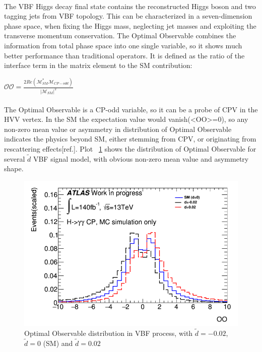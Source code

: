 \paragraph{}The VBF Higgs decay final state contains the reconstructed Higgs boson and two tagging jets from VBF topology. This can be characterized in a seven-dimension phase space, when fixing the Higgs mass, neglecting jet masses and exploiting the transverse momentum conservation. The Optimal Observable combines the information from total phase space into one single variable, so it shows much better performance than traditional operators. It is defined as the ratio of the interface term in the matrix element to the SM contribution: 

\begin{center}
\begin{math}
\mathcal{OO} = \frac{2Re(\mathcal{M}^{\ast}_{SM} \mathcal{M}_{CP-odd})}{|\mathcal{M}_{SM}|^2}
\end{math}
\end{center}


\paragraph{}The Optimal Observable is a CP-odd variable, so it can be a probe of CPV in the HVV vertex. In the SM the expectation value would vanish(<OO>=0), so any non-zero mean value or asymmetry in distribution of Optimal Observable indicates the physics beyond SM, either stemming from CPV, or originating from rescattering effects[ref.]. Plot ~\ref{fig:OOwithd} shows the distribution of Optimal Observable for several $\tilde{d}$ VBF signal model, with obvious non-zero mean value and asymmetry shape. 

\begin{figure}[h]
	\centering
	\includegraphics[width=.7\textwidth]{figure/OOind.png}
	\caption{Optimal Observable distribution in VBF process, with $\tilde{d}=-0.02$, $\tilde{d}=0$ (SM) and $\tilde{d}=0.02$}
	\label{fig:OOwithd}
\end{figure}

